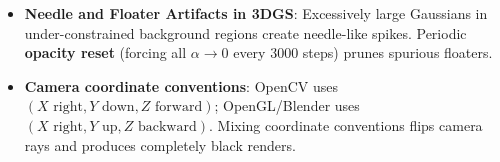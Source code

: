 \begin{trap}
\begin{itemize}[leftmargin=*,itemsep=0.8pt]
\item \textbf{Needle and Floater Artifacts in 3DGS}: Excessively large Gaussians in under-constrained background regions create needle-like spikes. Periodic \textbf{opacity reset} (forcing all $\alpha \to 0$ every $3000$ steps) prunes spurious floaters.
\item \textbf{Camera coordinate conventions}: OpenCV uses $(X \text{ right}, Y \text{ down}, Z \text{ forward})$; OpenGL/Blender uses $(X \text{ right}, Y \text{ up}, Z \text{ backward})$. Mixing coordinate conventions flips camera rays and produces completely black renders.
\end{itemize}
\end{trap}
